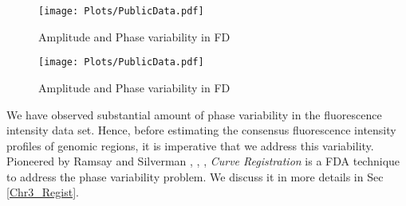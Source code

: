 \begin{figure}[H]
\begin{center}
\texttt{[image: Plots/PublicData.pdf]}
\end{center}
\caption{Amplitude and Phase variability in FD}
\label{fig:Fig3_growthF}
\end{figure}


\begin{figure}[H]
\begin{center}
\texttt{[image: Plots/PublicData.pdf]}
\end{center}
\caption{Amplitude and Phase variability in FD}
\label{fig:Fig3_pinch}
\end{figure}

We have observed substantial amount of phase variability in the fluorescence intensity data set. Hence, before estimating the consensus fluorescence intensity profiles of genomic regions, it is imperative that we address this variability. Pioneered by Ramsay and Silverman \cite{Ramsay_2006_Functional}, \cite{Ramsay_Li_1998_JRSSB}, \cite{Ramsay_etal_2009_Functional_R}, {\emph{Curve Registration}} is a FDA technique to address the phase variability problem. We discuss it in more details in Sec \ref{Chr3_Regist}.

